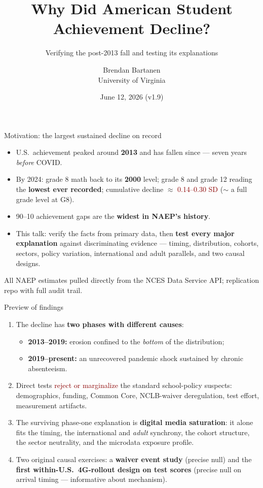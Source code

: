 \documentclass[11pt,aspectratio=169]{beamer}
\title{Why Did American Student Achievement Decline?}
\subtitle{Verifying the post-2013 fall and testing its explanations}
\author{Brendan Bartanen\\ \small University of Virginia}
\date{June 12, 2026 (v1.9)}
\newcommand{\red}[1]{\textcolor{darkred}{#1}}
\newcommand{\gray}[1]{\textcolor{ltgray}{#1}}
\newcommand{\src}[1]{\vfill\gray{\scriptsize #1}}
\begin{document}
\begin{frame}
\titlepage
\end{frame}

\begin{frame}{Motivation: the largest sustained decline on record}
\begin{itemize}
\item U.S.\ achievement peaked around \textbf{2013} and has fallen since --- seven years \emph{before} COVID.
\item By 2024: grade 8 math back to its \textbf{2000} level; grade 8 and grade 12 reading the \textbf{lowest ever recorded}; cumulative decline $\approx$ \red{0.14--0.30 SD} ($\sim$ a full grade level at G8).
\item 90--10 achievement gaps are the \textbf{widest in NAEP's history}.
\item This talk: verify the facts from primary data, then \textbf{test every major explanation} against discriminating evidence --- timing, distribution, cohorts, sectors, policy variation, international and adult parallels, and two causal designs.
\end{itemize}
\src{All NAEP estimates pulled directly from the NCES Data Service API; replication repo with full audit trail.}
\end{frame}

\begin{frame}{Preview of findings}
\begin{enumerate}
\item The decline has \textbf{two phases with different causes}:
  \begin{itemize}
  \item \textbf{2013--2019:} erosion confined to the \emph{bottom} of the distribution;
  \item \textbf{2019--present:} an unrecovered pandemic shock sustained by chronic absenteeism.
  \end{itemize}
\item Direct tests \red{reject or marginalize} the standard school-policy suspects: demographics, funding, Common Core, NCLB-waiver deregulation, test effort, measurement artifacts.
\item The surviving phase-one explanation is \textbf{digital media saturation}: it alone fits the timing, the international and \emph{adult} synchrony, the cohort structure, the sector neutrality, and the microdata exposure profile.
\item Two original causal exercises: a \textbf{waiver event study} (precise null) and the \textbf{first within-U.S.\ 4G-rollout design on test scores} (precise null on arrival timing --- informative about mechanism).
\end{enumerate}
\end{frame}
\end{document}
